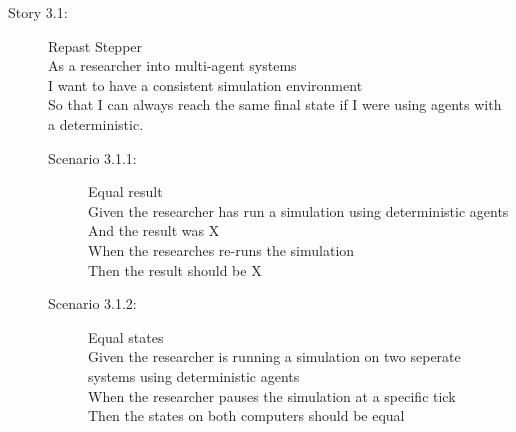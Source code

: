 \begin{description}
\item[Story 3.1:] Repast Stepper\\
As a researcher into multi-agent systems\\
I want to have a consistent simulation environment\\ So that I can always reach the same final state if I were using agents with a \gls{deterministic}.

\begin{description}
\item[Scenario 3.1.1:] Equal result\\
Given the researcher has run a simulation using deterministic agents\\
And the result was X\\
When the researches re-runs the simulation\\
Then the result should be X

\item[Scenario 3.1.2:] Equal states\\
Given the researcher is running a simulation on two seperate systems using deterministic agents\\
When the researcher pauses the simulation at a specific tick\\
Then the states on both computers should be equal
\end{description}
\end{description}




